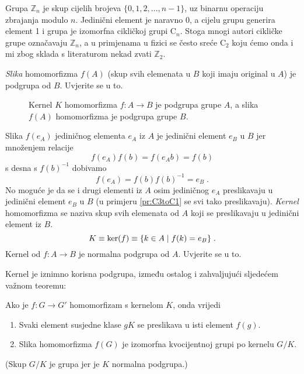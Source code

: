 \begin{primjer}
    Grupa $\mathbb{Z}_n$ je skup cijelih brojeva $\{0, 1, 2, \ldots, n-1\}$,
    uz binarnu operaciju zbrajanja modulo $n$. Jedinični element je naravno 0,
    a cijelu grupu generira element 1 i grupa je izomorfna cikličkoj grupi $\mathrm{C}_n$.
    Stoga mnogi autori cikličke grupe označavaju $\mathbb{Z}_n$, a u primjenama u fizici
    se često sreće $\mathrm{C}_2$ koju ćemo onda i mi zbog sklada s literaturom
    nekad zvati $\mathbb{Z}_2$.
\end{primjer}

\emph{Slika} homomorfizma $f(A)$ (skup svih elemenata u $B$ koji imaju original u $A$) 
je podgrupa od $B$. Uvjerite se u to.


\begin{figure}[htpb]
    \centering
    
    \caption{Kernel $K$ homomorfizma $f:A\to B$ je podgrupa grupe $A$,
    a slika $f(A)$ homomorfizma je podgrupa grupe $B$.}
    \label{fig:kernelslika}
\end{figure}


Slika $f(e_A)$ jediničnog elementa $e_A$ iz $A$ je jedinični element $e_B$ u $B$ jer
množenjem relacije
$$ f(e_A) f(b) = f(e_A b) = f(b) $$
s desna s $f(b)^{-1}$ dobivamo
$$ f(e_A) = f(b) f(b)^{-1} = e_B \;. $$
No moguće je da se i drugi elementi iz $A$ osim jediničnog $e_A$ preslikavaju u 
jedinični element $e_B$ u $B$ (u primjeru \ref{pr:C3toC1} se svi tako preslikavaju).
\emph{Kernel} homomorfizma se naziva skup svih elemenata od $A$ koji se
preslikavaju u jedinični element iz $B$.
$$ K \equiv {\rm ker}(f) \equiv \{ k\in A \; | \; f(k) = e_B \} \;. $$
Kernel od $f:A\to B$ je normalna podgrupa od $A$. Uvjerite se u to.

Kernel je iznimno korisna podgrupa, između ostalog i zahvaljujući sljedećem
važnom teoremu:
\begin{teorem}
\label{th:izomorfizam}
Ako je $f:G\to G'$ homomorfizam s kernelom $K$, onda vrijedi
\begin{enumerate}
\item Svaki element susjedne klase $gK$ se preslikava u isti element $f(g)$.
\item Slika homomorfizma $f(G)$ je izomorfna kvocijentnoj grupi po kernelu $G/K$.
\end{enumerate}
\end{teorem}
(Skup $G/K$ je grupa jer je $K$ normalna podgrupa.)

